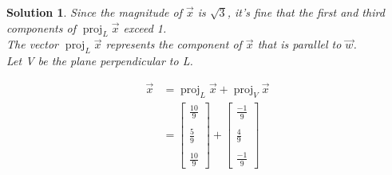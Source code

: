 \documentclass{article}
\newtheorem*{solution}{Solution}
\DeclareMathOperator{\proj}{proj}
\newcommand{\vectorproj}[2][]{\proj_{#1}#2}
\begin{document}
\begin{solution}
Since the magnitude of $\vec{x}$ is $\sqrt{3}$, it's fine that the first and third components of $\vectorproj[L]{\vec{x}}$ exceed 1. \\

The vector $\vectorproj[L]{\vec{x}}$ represents the component of $\vec{x}$ that is parallel to $\vec{w}$. \\

Let V be the plane perpendicular to L.

\begin{align*}
\vec{x} &= \vectorproj[L]{\vec{x}} + \vectorproj[V]{\vec{x}} \\
&= \begin{bmatrix} \frac{10}{9} \\ \\  \frac{5}{9} \\ \\ \frac{10}{9} \end{bmatrix} + \begin{bmatrix} \frac{-1}{9} \\ \\  \frac{4}{9} \\ \\ \frac{-1}{9} \end{bmatrix}
\end{align*}
\end{solution}
\end{document}
